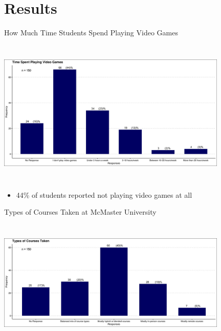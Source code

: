 \documentclass{beamer}
\begin{document}
	\section{Results}
	
	\begin{frame}{How Much Time Students Spend Playing Video Games}
		\begin{center}
		\includegraphics[width=11cm, height=7cm]{time_spent_playing_videogames.jpg}
		\begin{itemize}
			\item 44\% of students reported not playing video games at all
		\end{itemize}
		\end{center}
	\end{frame}

	\begin{frame}{Types of Courses Taken at McMaster University}
		\begin{center}
		\includegraphics[width=11cm, height=6cm]{types_of_courses_taken.jpg}
		\end{center}
	\end{frame}
\end{document}

